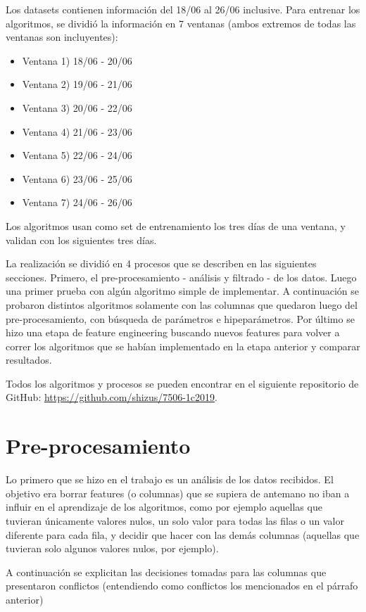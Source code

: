 \documentclass{article}
\begin{document}
Los datasets contienen información del 18/06 al 26/06 inclusive.
Para entrenar los algoritmos, se dividió la información en 7 ventanas (ambos extremos de todas las ventanas son incluyentes):

\begin{itemize}
    \item Ventana 1) 18/06 - 20/06 \item Ventana 2) 19/06 - 21/06
    \item Ventana 3) 20/06 - 22/06 \item Ventana 4) 21/06 - 23/06
    \item Ventana 5) 22/06 - 24/06 \item Ventana 6) 23/06 - 25/06
    \item Ventana 7) 24/06 - 26/06
\end{itemize}

Los algoritmos usan como set de entrenamiento los tres días de una ventana, y validan con los siguientes tres días.

La realización se dividió en 4 procesos que se describen en las siguientes secciones.
Primero, el pre-procesamiento - análisis y filtrado - de los datos. Luego una primer prueba con algún algoritmo simple de implementar. A continuación se probaron distintos algoritmos solamente con las columnas que quedaron luego del pre-procesamiento, con búsqueda de parámetros e hipeparámetros. Por último se hizo una etapa de feature engineering buscando nuevos features para volver a correr los algoritmos que se habían implementado en la etapa anterior y comparar resultados.

Todos los algoritmos y procesos se pueden encontrar en el siguiente repositorio de GitHub: \href{https://github.com/shizus/7506-1c2019}{https://github.com/shizus/7506-1c2019}.

\newpage
\section{Pre-procesamiento}
Lo primero que se hizo en el trabajo es un análisis de los datos recibidos. El objetivo era borrar features (o columnas) que se supiera de antemano no iban a influir en el aprendizaje de los algoritmos, como por ejemplo aquellas que tuvieran únicamente valores nulos, un solo valor para todas las filas o un valor diferente para cada fila, y decidir que hacer con las demás columnas (aquellas que tuvieran solo algunos valores nulos, por ejemplo).

A continuación se explicitan las decisiones tomadas para las columnas que presentaron conflictos (entendiendo como conflictos los mencionados en el párrafo anterior)
\end{document}
